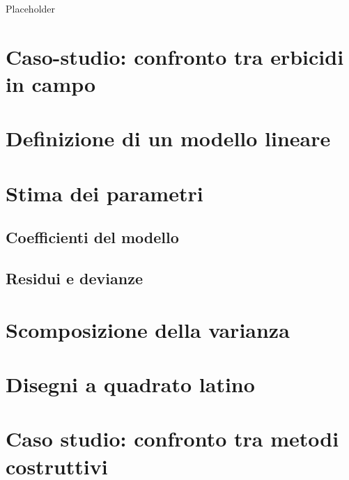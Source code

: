 \documentclass[a4paper,12pt,oneside]{book}
\begin{document}
Placeholder

\hypertarget{caso-studio-confronto-tra-erbicidi-in-campo}{%
\section{Caso-studio: confronto tra erbicidi in campo}\label{caso-studio-confronto-tra-erbicidi-in-campo}}

\hypertarget{definizione-di-un-modello-lineare-1}{%
\section{Definizione di un modello lineare}\label{definizione-di-un-modello-lineare-1}}

\hypertarget{stima-dei-parametri-1}{%
\section{Stima dei parametri}\label{stima-dei-parametri-1}}

\hypertarget{coefficienti-del-modello}{%
\subsection{Coefficienti del modello}\label{coefficienti-del-modello}}

\hypertarget{residui-e-devianze}{%
\subsection{Residui e devianze}\label{residui-e-devianze}}

\hypertarget{scomposizione-della-varianza-1}{%
\section{Scomposizione della varianza}\label{scomposizione-della-varianza-1}}

\hypertarget{disegni-a-quadrato-latino-1}{%
\section{Disegni a quadrato latino}\label{disegni-a-quadrato-latino-1}}

\hypertarget{caso-studio-confronto-tra-metodi-costruttivi}{%
\section{Caso studio: confronto tra metodi costruttivi}\label{caso-studio-confronto-tra-metodi-costruttivi}}
\end{document}
